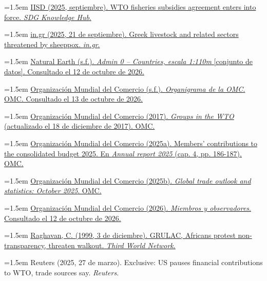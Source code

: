 \documentclass[10pt,a4paper]{article}
\begin{document}
\noindent\hangindent=1.5em \href{https://sdg.iisd.org/news/wto-fisheries-subsidies-agreement-enters-into-force/}{IISD (2025, septiembre). WTO fisheries subsidies agreement enters into force. \textit{SDG Knowledge Hub}.}

\noindent\hangindent=1.5em \href{https://www.in.gr/2025/09/21/english-edition/greek-livestock-related-sectors-threatened-sheeppox/}{in.gr (2025, 21 de septiembre). Greek livestock and related sectors threatened by sheeppox. \textit{in.gr}.}

\noindent\hangindent=1.5em \href{https://www.naturalearthdata.com/}{Natural Earth (s.f.). \textit{Admin 0 -- Countries, escala 1:110m} [conjunto de datos]. Consultado el 12 de octubre de 2026.}

\noindent\hangindent=1.5em \href{https://www.wto.org/spanish/thewto_s/whatis_s/tif_s/organigram_s.pdf}{Organización Mundial del Comercio (s.f.). \textit{Organigrama de la OMC}. OMC. Consultado el 13 de octubre de 2026.}

\noindent\hangindent=1.5em \href{https://www.wto.org/english/tratop_e/dda_e/negotiating_groups_e.pdf}{Organización Mundial del Comercio (2017). \textit{Groups in the WTO} (actualizado el 18 de diciembre de 2017). OMC.}

\noindent\hangindent=1.5em \href{https://www.wto.org/english/thewto_e/secre_e/budget_e/budget2025_member_contribution_e.pdf}{Organización Mundial del Comercio (2025a). Members' contributions to the consolidated budget 2025. En \textit{Annual report 2025} (cap. 4, pp. 186-187). OMC.}

\noindent\hangindent=1.5em \href{https://www.wto.org/english/news_e/news25_e/stat_07oct25_e.pdf}{Organización Mundial del Comercio (2025b). \textit{Global trade outlook and statistics: October 2025}. OMC.}

\noindent\hangindent=1.5em \href{https://www.wto.org/spanish/thewto_s/whatis_s/tif_s/org6_s.htm}{Organización Mundial del Comercio (2026). \textit{Miembros y observadores}. Consultado el 12 de octubre de 2026.}

\noindent\hangindent=1.5em \href{https://twn.my/title/grulac-cn.htm}{Raghavan, C. (1999, 3 de diciembre). GRULAC, Africans protest non-transparency, threaten walkout. \textit{Third World Network}.}

\noindent\hangindent=1.5em Reuters (2025, 27 de marzo). Exclusive: US pauses financial contributions to WTO, trade sources say. \textit{Reuters}.
\end{document}
